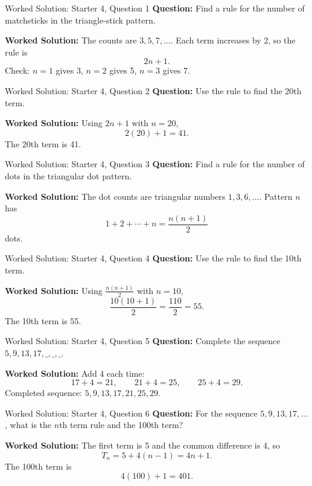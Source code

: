 \documentclass{beamer}
\begin{document}
\begin{frame}{Worked Solution: Starter 4, Question 1}
  \hypertarget{work-st4}{}
  \textbf{Question:} Find a rule for the number of matchsticks in the triangle-stick pattern.

  \textbf{Worked Solution:} The counts are \(3, 5, 7, \dots\). Each term increases by 2, so the rule is
  \[
    2n+1.
  \]
  Check: \(n=1\) gives 3, \(n=2\) gives 5, \(n=3\) gives 7.
\end{frame}

\begin{frame}{Worked Solution: Starter 4, Question 2}
  \textbf{Question:} Use the rule to find the 20th term.

  \textbf{Worked Solution:} Using \(2n+1\) with \(n=20\),
  \[
    2(20)+1=41.
  \]
  The 20th term is 41.
\end{frame}

\begin{frame}{Worked Solution: Starter 4, Question 3}
  \textbf{Question:} Find a rule for the number of dots in the triangular dot pattern.

  \textbf{Worked Solution:} The dot counts are triangular numbers \(1, 3, 6, \dots\). Pattern \(n\) has
  \[
    1+2+\cdots+n=\frac{n(n+1)}{2}
  \]
  dots.
\end{frame}

\begin{frame}{Worked Solution: Starter 4, Question 4}
  \textbf{Question:} Use the rule to find the 10th term.

  \textbf{Worked Solution:} Using \(\frac{n(n+1)}{2}\) with \(n=10\),
  \[
    \frac{10(10+1)}{2}=\frac{110}{2}=55.
  \]
  The 10th term is 55.
\end{frame}

\begin{frame}{Worked Solution: Starter 4, Question 5}
  \textbf{Question:} Complete the sequence \(5, 9, 13, 17, \_, \_, \_. \)

  \textbf{Worked Solution:} Add 4 each time:
  \[
    17+4=21,\qquad 21+4=25,\qquad 25+4=29.
  \]
  Completed sequence: \(5, 9, 13, 17, 21, 25, 29\).
\end{frame}

\begin{frame}{Worked Solution: Starter 4, Question 6}
  \textbf{Question:} For the sequence \(5, 9, 13, 17, \dots\), what is the \(n\)th term rule and the 100th term?

  \textbf{Worked Solution:} The first term is 5 and the common difference is 4, so
  \[
    T_n = 5 + 4(n-1) = 4n+1.
  \]
  The 100th term is
  \[
    4(100)+1=401.
  \]
\end{frame}
\end{document}
